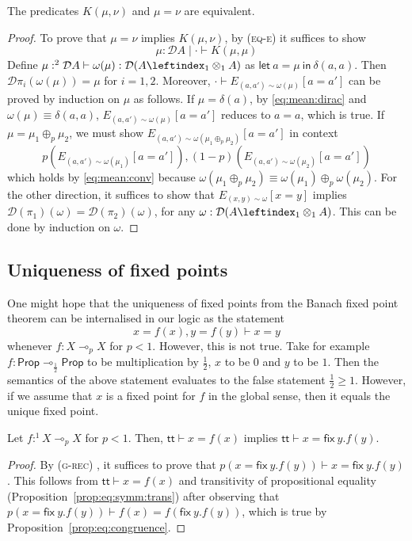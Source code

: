 \documentclass[a4paper,UKenglish,cleveref, autoref, thm-restate]{lipics-v2021}
\newcommand{\lol}{\mathbin{\multimap}}
\newcommand{\pair}[2]{\otimes_{#1,#2}}
\renewcommand{\pair}[2]{\leftindex_{#1}\otimes_{#2}} %
\newcommand{\ts}{\vdash}
\newcommand{\hastype}[3]{#1\ts #2 : #3}
\newcommand{\letIn}[2]{\mathsf{let~} #1 \mathsf{~in~} #2}
\newcommand{\fix}[2]{\mathsf{fix~} #1 . #2 }
\newcommand{\mean}[3]{E_{#1 \sim #2}[#3]}
\newcommand{\Prop}{\mathsf{Prop}}
\newcommand{\true}{\mathsf{tt}}
\newcommand{\TD}{\mathcal{D}}
\newcommand{\kant}[2]{K(#1,#2)}
\newcommand{\logicJ}[3][\Delta]{#1 \mid #2 \vdash #3}
\newcommand{\peq}{=}
\newcommand{\jeq}{\equiv}
\begin{document}
\begin{theorem} \label{thm:internal:Kantorovic}
 The predicates $\kant\mu\nu$ and $\mu\peq \nu$ are equivalent.
\end{theorem}

\begin{proof}
 To prove that $\mu\peq \nu$ implies $\kant\mu\nu$, by (\textsc{eq-e}) it suffices to show
 \[
 \logicJ[\mu : \TD A]{\cdot}{\kant\mu\mu}
 \]
 Define $\hastype{\mu:^2 \TD A}{\omega(\mu)}{\TD(A \pair11 A)}$ as
 $\letIn{a = \mu}{\delta(a,a)}$. Then $\TD\pi_i(\omega(\mu)) \peq \mu$ for $i=1,2$.
Moreover, $\cdot \ts \mean{(a,a')}{\omega(\mu)}{a \peq a'}$ can be proved by induction on $\mu$ as follows. If $\mu = \delta(a)$, by \eqref{eq:mean:dirac} and $\omega(\mu) \jeq \delta(a,a)$, $\mean{(a,a')}{\omega(\mu)}{a \peq a'}$ reduces to $a\peq a$, which is true. If $\mu = \mu_1 \oplus_p \mu_2$, we must show
$\mean{(a,a')}{\omega(\mu_1\oplus_p \mu_2)}{a \peq a'}$ in context
\[
 p(\mean{(a,a')}{\omega(\mu_1)}{a \peq a'}), (1-p)(\mean{(a,a')}{\omega(\mu_2)}{a \peq a'}) 
\]
which holds by \eqref{eq:mean:conv} because $\omega(\mu_1\oplus_p \mu_2) \jeq \omega(\mu_1)\oplus_p \omega(\mu_2)$.
For the other direction, it suffices to show that $\mean{(x,y)}\omega{x\!\peq \!y}$ implies
$\TD(\pi_1)(\omega) \peq \TD(\pi_2)(\omega)$, for any $\omega : \TD(A \pair11 A)$. This can be done by induction on $\omega$. 
\end{proof}

\subsection{Uniqueness of fixed points}

One might hope that the uniqueness of fixed points from the Banach fixed point theorem can be internalised in our logic as the statement
\[ 
  x\peq f(x) , y \peq f(y) \ts x \peq y
\]
whenever $f : X \lol_p X$ for $p<1$. However, this is not true. Take for example $f : \Prop \lol_{\frac12} \Prop$ to be multiplication by $\frac12$, 
$x$ to be $0$ and $y$ to be $1$. Then the semantics of the above statement evaluates to the false statement $\frac 12 \geq 1$. However, if we
assume that $x$ is a fixed point for $f$ in the global sense, then it equals the unique fixed point. 

\begin{lemma} \label{lem:just:one:fix}
 Let $f :^1 X \lol_p X$ for $p < 1$. Then, $\true \ts x \peq f(x)$ implies $\true \ts x \peq \fix y f(y)$.
\end{lemma}
\begin{proof}
 By (\textsc{g-rec})%
 , it suffices to prove that
 $
 p(x \peq \fix y f(y)) \ts x \peq \fix y f(y)$. This follows from $\true \ts x \peq f(x)$ and transitivity of propositional equality (Proposition~\ref{prop:eq:symm:trans}) after observing that $p(x \peq \fix y f(y)) \ts f(x) \peq f(\fix y f(y))$, which is true by Proposition~\ref{prop:eq:congruence}.
\end{proof}
\end{document}
